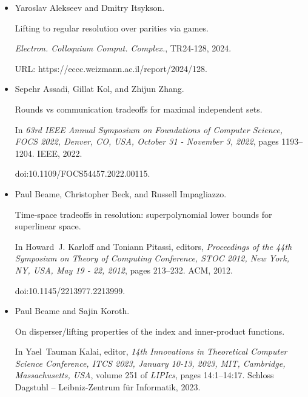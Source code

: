 \documentclass[10pt,a4paper]{article}
\begin{document}
\begin{itemize}


\item[] 
[1]

Yaroslav Alekseev and Dmitry Itsykson.


Lifting to regular resolution over parities via games.


\emph{Electron. Colloquium Comput. Complex.}, TR24-128, 2024.


URL: https://eccc.weizmann.ac.il/report/2024/128.





\item[] 
[2]

Sepehr Assadi, Gillat Kol, and Zhijun Zhang.


Rounds vs communication tradeoffs for maximal independent sets.


In \emph{63rd IEEE Annual Symposium on Foundations of Computer
Science, FOCS 2022, Denver, CO, USA, October 31 - November 3, 2022}, pages
1193–1204. IEEE, 2022.


doi:10.1109/FOCS54457.2022.00115.





\item[] 
[3]

Paul Beame, Christopher Beck, and Russell Impagliazzo.


Time-space tradeoffs in resolution: superpolynomial lower bounds for
superlinear space.


In Howard J. Karloff and Toniann Pitassi, editors, \emph{Proceedings
of the 44th Symposium on Theory of Computing Conference, STOC 2012, New
York, NY, USA, May 19 - 22, 2012}, pages 213–232. ACM, 2012.


doi:10.1145/2213977.2213999.





\item[] 
[4]

Paul Beame and Sajin Koroth.


On disperser/lifting properties of the index and inner-product
functions.


In Yael Tauman Kalai, editor, \emph{14th Innovations in Theoretical
Computer Science Conference, ITCS 2023, January 10-13, 2023, MIT,
Cambridge, Massachusetts, USA}, volume 251 of \emph{LIPIcs}, pages
14:1–14:17. Schloss Dagstuhl – Leibniz-Zentrum für Informatik, 2023.



\end{itemize}
\end{document}
